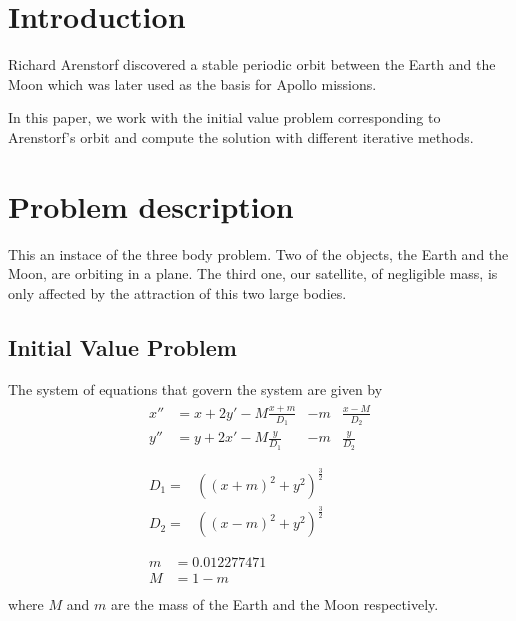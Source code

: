 \documentclass[12pt, onside]{article}
\newcommand{\ddv}{\dprime}
\renewcommand{\dv}{\prime}
\begin{document}

\newpage
\tableofcontents
\newpage

\section{Introduction}

    Richard Arenstorf discovered a stable periodic orbit between the Earth and the Moon
which was later used as the basis for Apollo missions.

    In this paper, we work with the initial value problem corresponding to Arenstorf's orbit
and compute the solution with different iterative methods.

\section{Problem description}

    This an instace of the three body problem.
Two of the objects, the Earth and the Moon, are orbiting in a plane.
The third one, our satellite, of negligible mass,
is only affected by the attraction of this two large bodies.

\subsection{Initial Value Problem}

    The system of equations that govern the system are given by
%
\begin{gather*}
    \begin{alignedat}{2}
        x\ddv &= x + 2y\dv - M\frac{x+m}{D_1}& - m&\frac{x-M}{D_2} \\
        y\ddv &= y + 2x\dv - M\frac{y}{D_1}& - m&\frac{y}{D_2} \\
    \end{alignedat} \\
    \begin{alignedat}{1}
        D_1 = &((x+m)^2 + y^2)^{\frac{3}{2}} \\
        D_2 = &((x-m)^2 + y^2)^{\frac{3}{2}} \\
    \end{alignedat} \\
    \begin{alignedat}{1}
        m &= \num{0.012277471} \\
        M &= 1-m \\
    \end{alignedat}
\end{gather*}
%
where $M$ and $m$ are the mass of the Earth and the Moon respectively.
\end{document}
